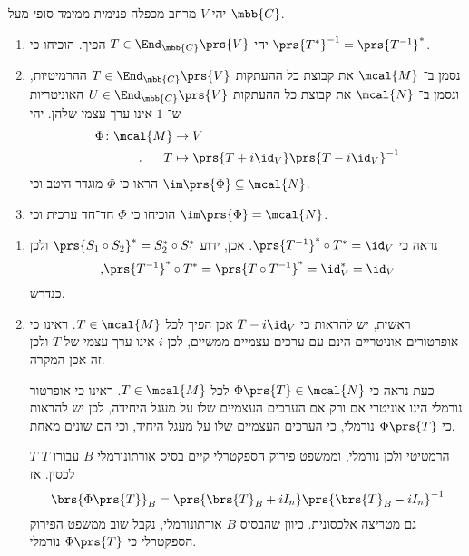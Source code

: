 \documentclass[a4paper,10pt,twoside,openany]{book}
\begin{document}
\begin{exercisechap}
יהי
$V$
מרחב מכפלה פנימית ממימד סופי מעל
$\mbb{C}$.

\begin{enumerate}
\item
יהי
$T \in \End_{\mbb{C}}\prs{V}$
הפיך. הוכיחו כי
$\prs{T^*}^{-1} = \prs{T^{-1}}^*$.

\item
נסמן ב־%
$\mcal{M}$
את קבוצת כל ההעתקות
$T \in \End_{\mbb{C}}\prs{V}$
ההרמיטיות, ונסמן ב־%
$\mcal{N}$
את קבוצת כל ההעתקות
$U \in \End_{\mbb{C}}\prs{V}$
האוניטריות ש־%
$1$
אינו ערך עצמי שלהן.
יהי
\begin{align*}
\Phi \colon \mcal{M} &\to V \\
\text{.} \hphantom{lala} T &\mapsto \prs{T + i \id_V} \prs{T - i \id_V}^{-1}
\end{align*}
הראו כי
$\Phi$
מוגדר היטב וכי
$\im\prs{\Phi} \subseteq \mcal{N}$.

\item
הוכיחו כי
$\Phi$
חד־חד ערכית וכי
$\im\prs{\Phi} = \mcal{N}$.
\end{enumerate}

\begin{solution}
\begin{enumerate}
\item נראה כי
$\prs{T^{-1}}^* \circ T^* = \id_V$.
אכן, ידוע
$\prs{S_1 \circ S_2}^* = S_2^* \circ S_1^*$
ולכן
\[\text{,} \prs{T^{-1}}^* \circ T^* = \prs{T \circ T^{-1}}^* = \id_V^* = \id_V\]
כנדרש.

\item
ראשית, יש להראות כי
$T - i \id_V$
אכן הפיך לכל
$T \in \mcal{M}$.
ראינו כי אופרטורים אוניטריים הינם עם ערכים עצמיים ממשיים, לכן
$i$
אינו ערך עצמי של
$T$
ולכן זה אכן המקרה.

כעת נראה כי
$\Phi\prs{T} \in \mcal{N}$
לכל
$T \in \mcal{M}$.
ראינו כי אופרטור נורמלי הינו אוניטרי אם ורק אם הערכים העצמיים שלו על מעגל היחידה, לכן יש להראות כי
$\Phi\prs{T}$
נורמלי, כי הערכים העצמיים שלו על מעגל היחיד, וכי הם שונים מאחת.

$T$
הרמטיטי ולכן נורמלי, וממשפט פירוק הספקטרלי קיים בסיס אורתונורמלי
$B$
עבורו
$T$
לכסין.
אז
\[\brs{\Phi\prs{T}}_B = \prs{\brs{T}_B + i I_n} \prs{\brs{T}_B - i I_n}^{-1}\]
גם מטריצה אלכסונית. כיוון שהבסיס
$B$
אורתונורמלי, נקבל שוב ממשפט הפירוק הספקטרלי כי
$\Phi\prs{T}$
נורמלי.


\end{enumerate}
\end{solution}
\end{exercisechap}
\end{document}
